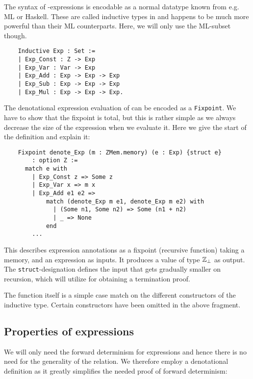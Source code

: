 The syntax of \janusz{}-expressions is encodable as a normal datatype
known from e.g. ML or Haskell. These are called inductive types in
\coq{} and happens to be much more powerful than their ML
counterparts. Here, we will only use the ML-subset though.
\begin{verbatim}
    Inductive Exp : Set :=
    | Exp_Const : Z -> Exp
    | Exp_Var : Var -> Exp
    | Exp_Add : Exp -> Exp -> Exp
    | Exp_Sub : Exp -> Exp -> Exp
    | Exp_Mul : Exp -> Exp -> Exp.
\end{verbatim}

The denotational expression evaluation of \janusz{} can be encoded as a
\texttt{Fixpoint}. We have to show that the fixpoint is total, but
this is rather simple as we always decrease the size of the expression
when we evaluate it. Here we give the start of the definition and
explain it:
\begin{verbatim}
    Fixpoint denote_Exp (m : ZMem.memory) (e : Exp) {struct e}
        : option Z :=
      match e with
        | Exp_Const z => Some z
        | Exp_Var x => m x
        | Exp_Add e1 e2 =>
            match (denote_Exp m e1, denote_Exp m e2) with
              | (Some n1, Some n2) => Some (n1 + n2)
              | _ => None
            end
        ...
\end{verbatim}
This describes expression annotations as a fixpoint (recursive
function) taking a memory, and an expression as inputs. It produces a
value of type $\mathbb{Z}_{\perp}$ as output. The
\texttt{struct}-designation defines the input that gets gradually
smaller on recursion, which \coq{} will utilize for obtaining a
termination proof.

The function itself is a simple case match on the different
constructors of the inductive type. Certain constructors have been
omitted in the above fragment.

\subsection{Properties of \janusz{} expressions}

We will only need the forward determinism for expressions and hence
there is no need for the generality of the relation. We therefore
employ a denotational definition as it greatly simplifies the needed
proof of forward determinism:

